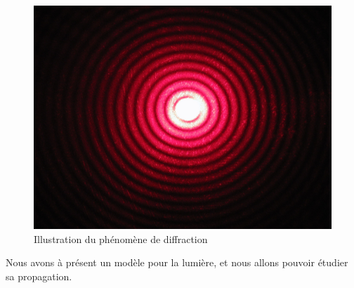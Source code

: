 \documentclass{classe}
\begin{document}
\begin{figure}[H]
	\centering
	\includegraphics[scale=.08]{Diffraction.jpeg}
	\caption{Illustration du phénomène de diffraction}
\end{figure}
Nous avons à présent un modèle pour la lumière, et nous allons pouvoir étudier sa propagation.
\end{document}
